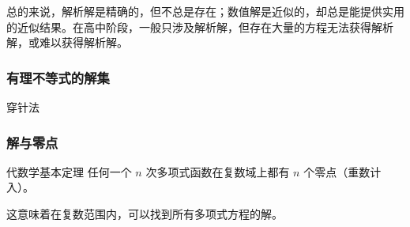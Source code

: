 总的来说，解析解是精确的，但不总是存在；数值解是近似的，却总是能提供实用的近似结果。在高中阶段，一般只涉及解析解，但存在大量的方程无法获得解析解，或难以获得解析解。

\subsubsection{有理不等式的解集}

穿针法

\subsubsection{解与零点}

\begin{definition}{代数学基本定理}
任何一个 $n$ 次多项式函数在复数域上都有 $n$ 个零点（重数计入）。
\end{definition}
这意味着在复数范围内，可以找到所有多项式方程的解。



